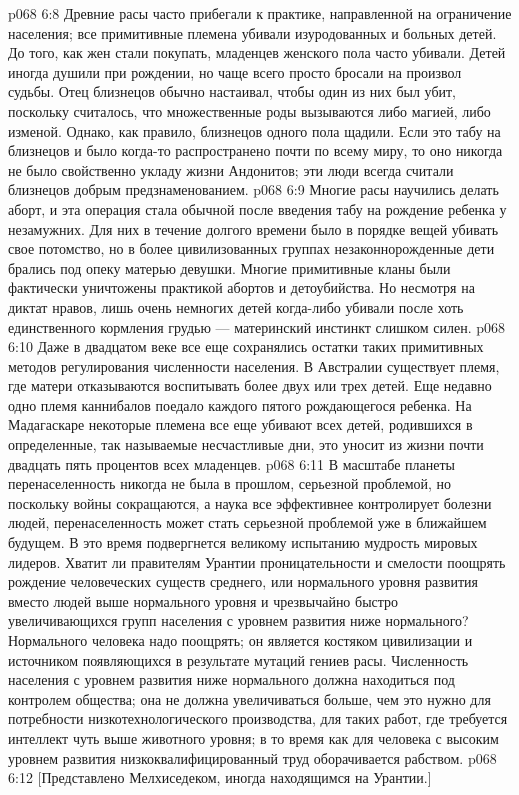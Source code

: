 \vs p068 6:8 Древние расы часто прибегали к практике, направленной на ограничение населения; все примитивные племена убивали изуродованных и больных детей. До того, как жен стали покупать, младенцев женского пола часто убивали. Детей иногда душили при рождении, но чаще всего просто бросали на произвол судьбы. Отец близнецов обычно настаивал, чтобы один из них был убит, поскольку считалось, что множественные роды вызываются либо магией, либо изменой. Однако, как правило, близнецов одного пола щадили. Если это табу на близнецов и было когда\hyp{}то распространено почти по всему миру, то оно никогда не было свойственно укладу жизни Андонитов; эти люди всегда считали близнецов добрым предзнаменованием.
\vs p068 6:9 Многие расы научились делать аборт, и эта операция стала обычной после введения табу на рождение ребенка у незамужних. Для них в течение долгого времени было в порядке вещей убивать свое потомство, но в более цивилизованных группах незаконнорожденные дети брались под опеку матерью девушки. Многие примитивные кланы были фактически уничтожены практикой абортов и детоубийства. Но несмотря на диктат нравов, лишь очень немногих детей когда\hyp{}либо убивали после хоть единственного кормления грудью --- материнский инстинкт слишком силен.
\vs p068 6:10 Даже в двадцатом веке все еще сохранялись остатки таких примитивных методов регулирования численности населения. В Австралии существует племя, где матери отказываются воспитывать более двух или трех детей. Еще недавно одно племя каннибалов поедало каждого пятого рождающегося ребенка. На Мадагаскаре некоторые племена все еще убивают всех детей, родившихся в определенные, так называемые несчастливые дни, это уносит из жизни почти двадцать пять процентов всех младенцев.
\vs p068 6:11 \pc В масштабе планеты перенаселенность никогда не была в прошлом, серьезной проблемой, но поскольку войны сокращаются, а наука все эффективнее контролирует болезни людей, перенаселенность может стать серьезной проблемой уже в ближайшем будущем. В это время подвергнется великому испытанию мудрость мировых лидеров. Хватит ли правителям Урантии проницательности и смелости поощрять рождение человеческих существ среднего, или нормального уровня развития вместо людей выше нормального уровня и чрезвычайно быстро увеличивающихся групп населения с уровнем развития ниже нормального? Нормального человека надо поощрять; он является костяком цивилизации и источником появляющихся в результате мутаций гениев расы. Численность населения с уровнем развития ниже нормального должна находиться под контролем общества; она не должна увеличиваться больше, чем это нужно для потребности низкотехнологического производства, для таких работ, где требуется интеллект чуть выше животного уровня; в то время как для человека с высоким уровнем развития низкоквалифицированный труд оборачивается рабством.
\vsetoff
\vs p068 6:12 [Представлено Мелхиседеком, иногда находящимся на Урантии.]
